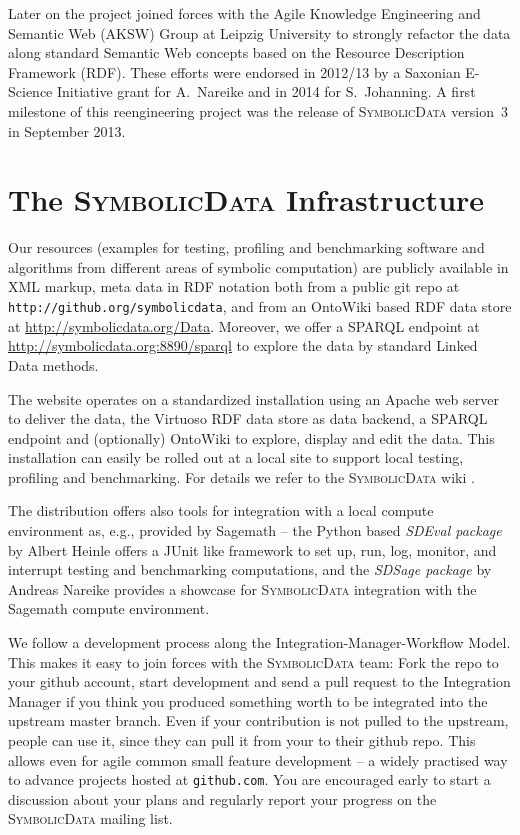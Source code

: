 \documentclass{svmult}
\newcommand{\SD}{\textsc{Symbolic\-Data}}
\begin{document}
Later on the project joined forces with the Agile Knowledge Engineering and
Semantic Web (AKSW) Group at Leipzig University \cite{AKSW} to strongly
refactor the data along standard Semantic Web concepts based on the Resource
Description Framework (RDF).  These efforts were endorsed in 2012/13 by a
Saxonian E-Science Initiative grant \cite{E-Science-Sachsen} for A.~Nareike
and in 2014 for S.~Johanning.  A first milestone of this reengineering project
was the release of {\SD} version~3 in September 2013.

\section{The {\SD} Infrastructure}

Our resources (examples for testing, profiling and benchmarking software and
algorithms from different areas of symbolic computation) are publicly
available in XML markup, meta data in RDF notation both from a public git repo
at \texttt{http://github.org/symbolicdata}, and from an OntoWiki
\cite{OntoWiki} based RDF data store at \url{http://symbolicdata.org/Data}.
Moreover, we offer a SPARQL endpoint at
\url{http://symbolicdata.org:8890/sparql} to explore the data by standard
Linked Data methods.

The website operates on a standardized installation using an Apache web server
to deliver the data, the Virtuoso RDF data store \cite{Virtuoso} as data
backend, a SPARQL endpoint and (optionally) OntoWiki to explore, display and
edit the data.  This installation can easily be rolled out at a local site to
support local testing, profiling and benchmarking.  For details we refer to
the {\SD} wiki \cite{SD}.

The distribution offers also tools for integration with a local compute
environment as, e.g., provided by Sagemath \cite{Sagemath} -- the Python based
\emph{SDEval package} \cite{sdeval} by Albert Heinle offers a JUnit like
framework to set up, run, log, monitor, and interrupt testing and benchmarking
computations, and the \emph{SDSage package} \cite{sdsage} by Andreas Nareike
provides a showcase for {\SD} integration with the Sagemath compute
environment.

We follow a development process along the Integration-Manager-Workflow Model.
This makes it easy to join forces with the {\SD} team: Fork the repo to your
github account, start development and send a pull request to the Integration
Manager if you think you produced something worth to be integrated into the
upstream master branch.  Even if your contribution is not pulled to the
upstream, people can use it, since they can pull it from your to their github
repo. This allows even for agile common small feature development -- a widely
practised way to advance projects hosted at \texttt{github.com}. You are
encouraged early to start a discussion about your plans and regularly report
your progress on the {\SD} mailing list.
\end{document}
